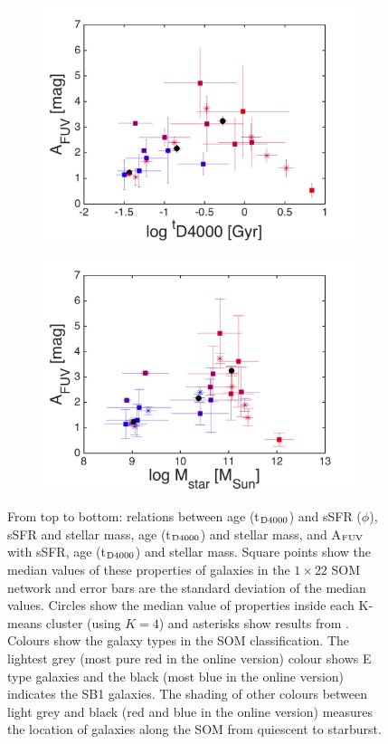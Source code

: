 \begin{figure}
\begin{subfigure}[b]{0.3\textwidth}
            \includegraphics[width=\textwidth]{images0.01/1d/f5.png}
        \end{subfigure}
       \hfill
        \begin{subfigure}[b]{0.3\textwidth}
            \includegraphics[width=\textwidth]{images0.01/1d/f6.png}
        \end{subfigure}
        \caption{From top to bottom: relations between age (t$_{\rm {D4000}}$) and sSFR ($\phi$), sSFR and stellar mass, age (t$_{\rm {D4000}}$) and stellar mass, and A$_{\rm {FUV}}$ with sSFR, age (t$_{\rm {D4000}}$) and stellar mass. Square points show the median values of these properties of galaxies in the $1\times22$ SOM network and error bars are the standard deviation of the median values. Circles show the median value of properties inside each K-means cluster (using $K=4$) and asterisks show results from . Colours show the galaxy types in the SOM classification. The lightest grey (most pure red in the online version) colour shows E type galaxies and the black (most blue in the online version) indicates the SB1 galaxies. The shading of other colours between light grey and black (red and blue in the online version) measures the location of galaxies along the SOM from  quiescent to starburst.}
        \label{fig: props_vs_props}
        \end{figure}
    
